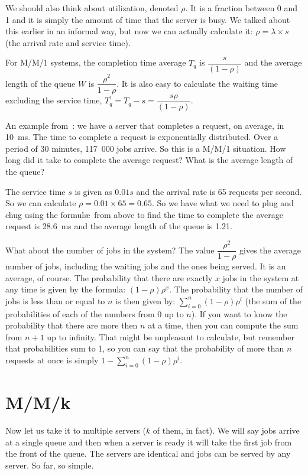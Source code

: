 \documentclass[a4paper]{report}
\begin{document}
We should also think about utilization, denoted $\rho$. It is a fraction between 0 and 1 and it is simply the amount of time that the server is busy. We talked about this earlier in an informal way, but now we can actually calculate it: $\rho = \lambda \times s$ (the arrival rate and service time). 

For M/M/1 systems, the completion time average $T_{q}$ is $\dfrac{s}{(1-\rho)}$ and the average length of the queue $W$ is $\dfrac{\rho^{2}}{1-\rho}$. It is also easy to calculate the waiting time excluding the service time, $T^{\prime}_{q} = T_{q} - s = \dfrac{s\rho}{(1-\rho)}$.

An example from~\cite{williams-q}: we have a server that completes a request, on average, in 10~ms. The time to complete a request is exponentially distributed. Over a period of 30 minutes, 117~000 jobs arrive. So this is a M/M/1 situation. How long did it take to complete the average request? What is the average length of the queue?

The service time $s$ is given as $0.01s$ and the arrival rate is 65 requests per second. So we can calculate $\rho = 0.01 \times 65 = 0.65$. So we have what we need to plug and chug using the formul\ae\ from above to find the time to complete the average request is 28.6~ms and the average length of the queue is 1.21.

What about the number of jobs in the system? The value $\dfrac{\rho^{2}}{1-\rho}$ gives the average number of jobs, including the waiting jobs and the ones being served. It is an average, of course. The probability that there are exactly $x$ jobs in the system at any time is given by the formula: $(1-\rho)\rho^{x}$. The probability that the number of jobs is less than or equal to $n$ is then given by: $\sum\limits_{i=0}^{n}(1-\rho)\rho^{i}$ (the sum of the probabilities of each of the numbers from 0 up to $n$). If you want to know the probability that there are more then $n$ at a time, then you can compute the sum from $n+1$ up to infinity. That might be unpleasant to calculate, but remember that probabilities sum to 1, so you can say that the probability of more than $n$ requests at once is simply $1 - \sum\limits_{i=0}^{n}(1-\rho)\rho^{i}$.

\section*{M/M/k}

Now let us take it to multiple servers ($k$ of them, in fact). We will say jobs arrive at a single queue and then when a server is ready it will take the first job from the front of the queue. The servers are identical and jobs can be served by any server. So far, so simple.
\end{document}
